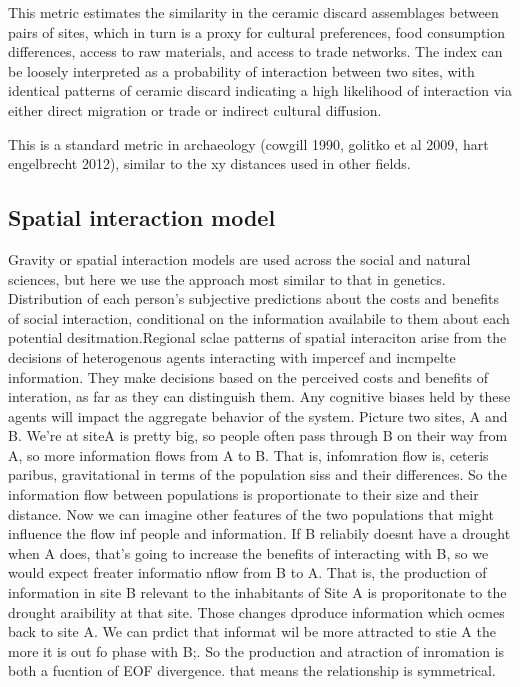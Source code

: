 \documentclass[fleqn,10pt]{wlscirep}
\begin{document}
This metric estimates the similarity in the ceramic discard assemblages between pairs of sites, which in turn is a proxy for cultural preferences, food consumption differences, access to raw materials, and access to trade networks. The index can be loosely interpreted as a probability of interaction between two sites, with identical patterns of ceramic discard indicating a high likelihood of interaction via either direct migration or trade or indirect cultural diffusion.

This is a standard metric in archaeology (cowgill 1990, golitko et al 2009, hart engelbrecht 2012), similar to the xy distances used in other fields.

\subsection*{Spatial interaction model}
Gravity or spatial interaction models are used across the social and natural sciences, but here we use the approach most similar to that in genetics.
Distribution of each person's subjective predictions about the costs and benefits of social interaction, conditional on the information availabile to them about each potential desitmation.Regional sclae patterns of spatial interaciton arise from the decisions of heterogenous agents interacting with impercef and incmpelte information. They make decisions based on the perceived costs and benefits of interation, as far as they can distinguish them. Any cognitive biases held by these agents will impact the aggregate behavior of the system.
 Picture two sites, A and B. We're at siteA is pretty big, so people often pass through B on their way from A, so more information flows from A to B. That is, infomration flow is, ceteris paribus, gravitational in terms of the population siss and their differences. So the information flow between populations is proportionate to their size and their distance. Now we can imagine other features of the two populations that might influence the flow inf people and information. If B reliabily doesnt have a drought when A does, that's going to increase the benefits of interacting with B, so we would expect freater informatio nflow from B to A. That is, the production of information in site B relevant to the inhabitants of Site A is proporitonate to the drought araibility at that site. Those changes dproduce information which ocmes back to site A. We can prdict that informat wil be more attracted to stie A the more it is out fo phase with B;. So the production and atraction of inromation is both a fucntion of EOF divergence. that means the relationship is symmetrical.
 
\end{document}

